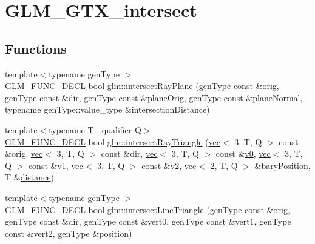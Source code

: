 \hypertarget{group__gtx__intersect}{}\section{G\+L\+M\+\_\+\+G\+T\+X\+\_\+intersect}
\label{group__gtx__intersect}
\subsection*{Functions}
\begin{DoxyCompactItemize}
\item 
{\footnotesize template$<$typename gen\+Type $>$ }\\\mbox{\hyperlink{setup_8hpp_ab2d052de21a70539923e9bcbf6e83a51}{G\+L\+M\+\_\+\+F\+U\+N\+C\+\_\+\+D\+E\+CL}} bool \mbox{\hyperlink{group__gtx__intersect_gad3697a9700ea379739a667ea02573488}{glm\+::intersect\+Ray\+Plane}} (gen\+Type const \&orig, gen\+Type const \&dir, gen\+Type const \&plane\+Orig, gen\+Type const \&plane\+Normal, typename gen\+Type\+::value\+\_\+type \&intersection\+Distance)
\item 
{\footnotesize template$<$typename T , qualifier Q$>$ }\\\mbox{\hyperlink{setup_8hpp_ab2d052de21a70539923e9bcbf6e83a51}{G\+L\+M\+\_\+\+F\+U\+N\+C\+\_\+\+D\+E\+CL}} bool \mbox{\hyperlink{group__gtx__intersect_ga65bf2c594482f04881c36bc761f9e946}{glm\+::intersect\+Ray\+Triangle}} (\mbox{\hyperlink{structglm_1_1vec}{vec}}$<$ 3, T, Q $>$ const \&orig, \mbox{\hyperlink{structglm_1_1vec}{vec}}$<$ 3, T, Q $>$ const \&dir, \mbox{\hyperlink{structglm_1_1vec}{vec}}$<$ 3, T, Q $>$ const \&\mbox{\hyperlink{_s_d_l__opengl__glext_8h_a7062a23d1d434121d4a88f530703d06a}{v0}}, \mbox{\hyperlink{structglm_1_1vec}{vec}}$<$ 3, T, Q $>$ const \&\mbox{\hyperlink{_s_d_l__opengl__glext_8h_a435c176a02c061b43e19bdf7c86cceae}{v1}}, \mbox{\hyperlink{structglm_1_1vec}{vec}}$<$ 3, T, Q $>$ const \&\mbox{\hyperlink{_s_d_l__opengl__glext_8h_a0928f6d0f0f794ba000a21dfae422136}{v2}}, \mbox{\hyperlink{structglm_1_1vec}{vec}}$<$ 2, T, Q $>$ \&bary\+Position, T \&\mbox{\hyperlink{_s_d_l__opengl__glext_8h_a744fbed01658cb96bb8ba7e85a86d1dc}{distance}})
\item 
{\footnotesize template$<$typename gen\+Type $>$ }\\\mbox{\hyperlink{setup_8hpp_ab2d052de21a70539923e9bcbf6e83a51}{G\+L\+M\+\_\+\+F\+U\+N\+C\+\_\+\+D\+E\+CL}} bool \mbox{\hyperlink{group__gtx__intersect_ga9d29b9b3acb504d43986502f42740df4}{glm\+::intersect\+Line\+Triangle}} (gen\+Type const \&orig, gen\+Type const \&dir, gen\+Type const \&vert0, gen\+Type const \&vert1, gen\+Type const \&vert2, gen\+Type \&position)

\end{DoxyCompactItemize}
